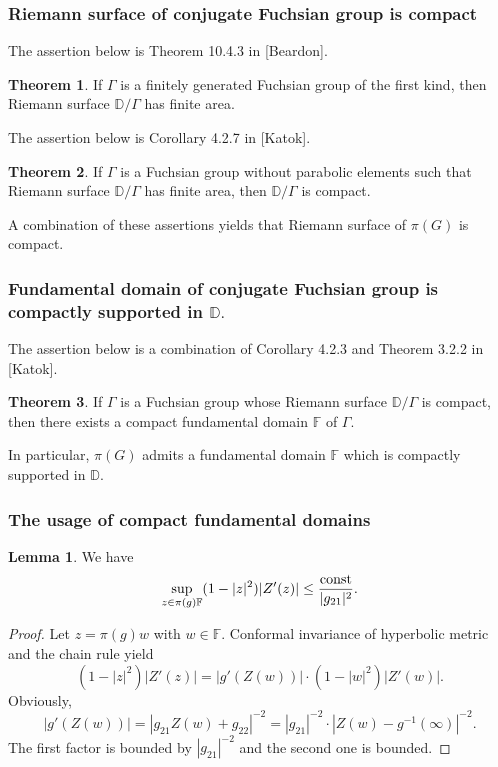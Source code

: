 \documentclass{beamer}
\theoremstyle{definition}
\newtheorem{thm}{Theorem}
\newtheorem{lem}{Lemma}
\begin{document}
\begin{frame}
\frametitle{Riemann surface of conjugate Fuchsian group is compact}

The assertion below is Theorem 10.4.3 in [Beardon].

\begin{thm} If $\Gamma$ is a finitely generated Fuchsian group of the first kind, then Riemann surface $\mathbb{D}/\Gamma$ has finite area.
\end{thm}

The assertion below is Corollary 4.2.7 in [Katok]. 

\begin{thm} If $\Gamma$ is a Fuchsian group without parabolic elements such that Riemann surface $\mathbb{D}/\Gamma$ has finite area, then $\mathbb{D}/\Gamma$ is compact.
\end{thm}

A combination of these assertions yields that Riemann surface of $\pi(G)$ is compact.
\end{frame}


\begin{frame}
\frametitle{Fundamental domain of conjugate Fuchsian group is compactly supported in $\mathbb{D}.$}

The assertion below is a combination of Corollary 4.2.3 and Theorem 3.2.2 in [Katok].

\begin{thm} If $\Gamma$ is a Fuchsian group whose Riemann surface $\mathbb{D}/\Gamma$ is compact, then there exists a compact fundamental domain $\mathbb{F}$ of $\Gamma.$

\end{thm}

In particular, $\pi(G)$ admits a fundamental domain $\mathbb{F}$ which is compactly supported in $\mathbb{D}.$
\end{frame}

\begin{frame}
\frametitle{The usage of compact fundamental domains}
\begin{lem} We have
$$\sup_{z\in\pi(g)\mathbb{F}}(1-|z|^2)|Z'(z)|\leq\frac{{\rm const}}{|g_{21}|^2}.$$
\end{lem}
\begin{proof} Let $z=\pi(g)w$ with $w\in\mathbb{F}.$ Conformal invariance of hyperbolic metric and the chain rule yield
$$(1-|z|^2)|Z'(z)|=|g'(Z(w))|\cdot(1-|w|^2)|Z'(w)|.$$
Obviously,
$$|g'(Z(w))|=|g_{21}Z(w)+g_{22}|^{-2}=|g_{21}|^{-2}\cdot |Z(w)-g^{-1}(\infty)|^{-2}.$$
The first factor is bounded by $|g_{21}|^{-2}$ and the second one is bounded.
\end{proof}
\end{frame}
\end{document}
